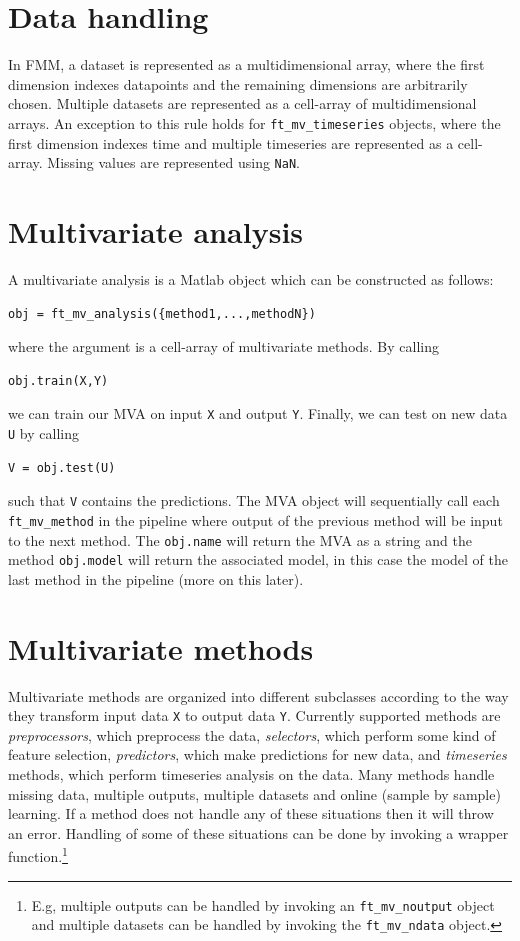 \documentclass{article}
\renewcommand{\t}[1]{{\tt #1}}
\begin{document}
\section{Data handling}

In FMM, a dataset is represented as a multidimensional array, where the first dimension indexes datapoints and the remaining dimensions are arbitrarily chosen. Multiple datasets are represented as a cell-array of multidimensional arrays. An exception to this rule holds for \t{ft\_mv\_timeseries} objects, where the first dimension indexes time and multiple timeseries are represented as a cell-array. Missing values are represented using \t{NaN}.

\section{Multivariate analysis}

A multivariate analysis is a Matlab object which can be constructed as follows:
\begin{verbatim}
obj = ft_mv_analysis({method1,...,methodN})
\end{verbatim}
where the argument is a cell-array of multivariate methods. By calling
\begin{verbatim}
obj.train(X,Y)
\end{verbatim}
we can train our MVA on input \t{X} and output \t{Y}. Finally, we can test on new data \t{U} by calling
\begin{verbatim}
V = obj.test(U)
\end{verbatim}
such that \t{V} contains the predictions. The MVA object will sequentially call each \t{ft\_mv\_method} in the pipeline where output of the previous method will be input to the next method. The \t{obj.name} will return the MVA as a string and the method \t{obj.model} will return the associated model, in this case the model of the last method in the pipeline (more on this later).

\newpage

\section{Multivariate methods}

Multivariate methods are organized into different subclasses according to the way they transform input data \t{X} to output data \t{Y}. Currently supported methods are {\em preprocessors}, which preprocess the data, {\em selectors}, which perform some kind of feature selection, {\em predictors}, which make predictions for new data, and {\em timeseries} methods, which perform timeseries analysis on the data. Many methods handle missing data, multiple outputs, multiple datasets and online (sample by sample) learning. If a method does not handle any of these situations then it will throw an error. Handling of some of these situations can be done by invoking a wrapper function.\footnote{E.g, multiple outputs can be handled by invoking an \t{ft\_mv\_noutput} object and multiple datasets can be handled by invoking the \t{ft\_mv\_ndata} object.}
\end{document}
